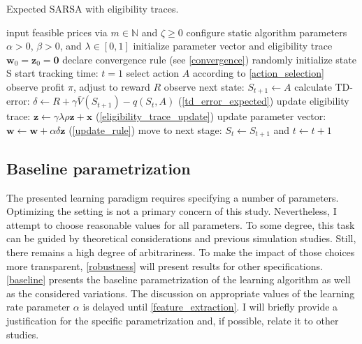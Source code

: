 \begin{algorithm}
	\caption{Expected SARSA with eligibility traces.}
	\begin{algorithmic}[testing]
		\label{expected SARSA}
		\small
		\STATE input feasible prices via $m \in \mathbb{N}$ and $\zeta \ge 0$
		\STATE configure static algorithm parameters $\alpha > 0$, $\beta > 0$, and $\lambda \in [0, 1]$
		\STATE initialize parameter vector and eligibility trace $\boldsymbol{w}_0 = \boldsymbol{z}_0 = \boldsymbol{0}$
		\STATE declare convergence rule (see \autoref{convergence})
		\STATE randomly initialize state S
		\STATE start tracking time: $t = 1$
		\STATE select action $A$ according to \autoref{action_selection}
		\STATE observe profit $\pi$, adjust to reward $R$
		\STATE observe next state: $S_{t+1} \leftarrow A$
		\STATE calculate TD-error: $\delta \leftarrow R +  \gamma \bar{V}(S_{t+1}) - \hat{q}(S_t, A)$ (\autoref{td_error_expected})
		\STATE update eligibility trace: $\boldsymbol{z} \leftarrow \gamma \lambda \rho \boldsymbol{z} + \boldsymbol{x} $ (\autoref{eligibility_trace_update})
		\STATE update parameter vector: $\boldsymbol{w} \leftarrow \boldsymbol{w} + \alpha  \delta  \boldsymbol{z}$ (\autoref{update_rule})
		\STATE move to next stage: $S_t \leftarrow S_{t+1}$ and $t \leftarrow t+1$
		\ENDWHILE
	\end{algorithmic}
\end{algorithm}

\subsection{Baseline parametrization}\label{parametrization}



The presented learning paradigm requires specifying a number of parameters. Optimizing the setting is not a primary concern of this study. Nevertheless, I attempt to choose reasonable values for all parameters. To some degree, this task can be guided by theoretical considerations and previous simulation studies. Still, there remains a high degree of arbitrariness. To make the impact of those choices more transparent, \autoref{robustness} will present results for other specifications. \autoref{baseline} presents the baseline parametrization of the learning algorithm as well as the considered variations. The discussion on appropriate values of the learning rate parameter $\alpha$ is delayed until \autoref{feature_extraction}. I will briefly provide a justification for the specific parametrization and, if possible, relate it to other studies.

